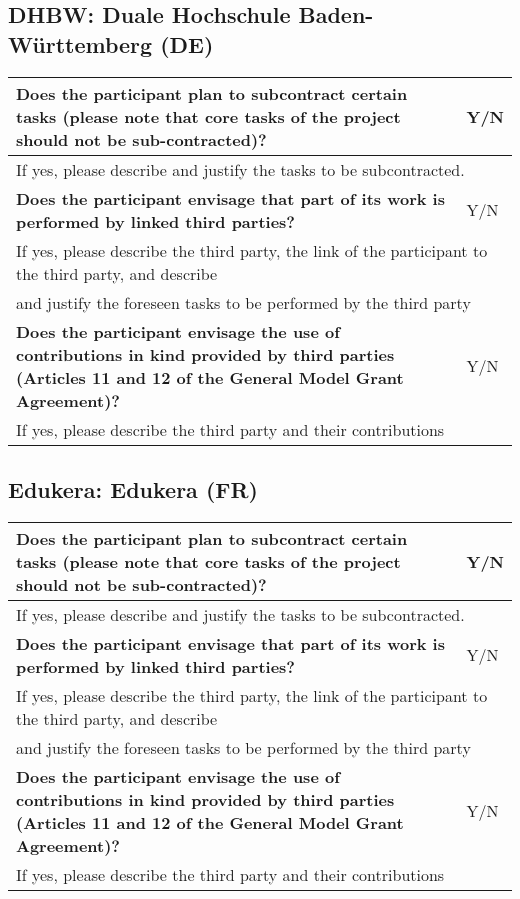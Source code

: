 \subsection{DHBW: Duale Hochschule Baden-Württemberg (DE)}

\begin{longtable}{|p{}|p{}|}
\hline
{\bf Does the participant plan to subcontract certain tasks (please
  note that core tasks of the project should not be sub-contracted)?}
&
Y/N
\\
\hline
\multicolumn{2}{|l|}{
If yes, please describe and justify the tasks to be subcontracted.}
\\
\hline
{\bf Does the participant envisage that  part of its work is performed
  by linked third parties?}
&
Y/N
\\
\hline
\multicolumn{2}{|l|}{If yes, please describe the third party, the link of the
  participant to the third party, and describe}\\
\multicolumn{2}{|l|}{and justify the foreseen
tasks to be performed by the third party}
\\
\hline
{\bf Does the participant envisage the use of contributions in kind
provided by third parties (Articles 11 and 12 of the General Model
Grant Agreement)?}
&
Y/N
\\
\hline
\multicolumn{2}{|l|}{If yes, please describe the third party and their contributions}
\\
\hline
\end{longtable}


\subsection{Edukera: Edukera (FR)}

\begin{longtable}{|p{}|p{}|}
\hline
{\bf Does the participant plan to subcontract certain tasks (please
  note that core tasks of the project should not be sub-contracted)?}
&
Y/N
\\
\hline
\multicolumn{2}{|l|}{
If yes, please describe and justify the tasks to be subcontracted.}
\\
\hline
{\bf Does the participant envisage that  part of its work is performed
  by linked third parties?}
&
Y/N
\\
\hline
\multicolumn{2}{|l|}{If yes, please describe the third party, the link of the
  participant to the third party, and describe}\\
\multicolumn{2}{|l|}{and justify the foreseen
tasks to be performed by the third party}
\\
\hline
{\bf Does the participant envisage the use of contributions in kind
provided by third parties (Articles 11 and 12 of the General Model
Grant Agreement)?}
&
Y/N
\\
\hline
\multicolumn{2}{|l|}{If yes, please describe the third party and their contributions}
\\
\hline
\end{longtable}



